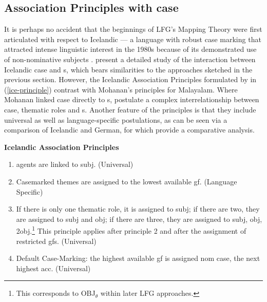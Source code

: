 \documentclass[output=paper,hidelinks]{langscibook}
\begin{document}
\subsection{Association Principles with case}

It is perhaps no accident that the beginnings of LFG's Mapping Theory were first
articulated with respect to Icelandic \citep{ZMT85:Case} --- a language with
robust case marking that attracted intense linguistic interest in the 1980s
because of its demonstrated use of non-nominative subjects \citep{Andrews76:VP}.
\citet{ZMT85:Case} present a detailed study of the interaction between Icelandic
case and {\GF}s, which bears similarities to the approaches sketched in the previous
section.  However, the Icelandic Association Principles formulated by
\citet{ZMT85:Case} in (\ref{ice-principle}) contrast with Mohanan's principles
for Malayalam. Where
Mohanan linked case directly to {\GF}s, \citet{ZMT85:Case} postulate a complex
interrelationship between case, thematic roles and {\GF}s. Another feature of
the principles is that they include  universal as well as language-specific
postulations, as can be seen via a comparison of Icelandic and German, for which
\citet{ZMT85:Case} provide a comparative analysis. 


\ea \label{ice-principle}
{\bf Icelandic Association Principles}

\begin{enumerate}

\item {\sc agents} are linked to {\sc subj}. (Universal)

\item Casemarked {\sc themes} are assigned to the lowest available
{\sc gf}.  (Language Specific)

\item If there is only one thematic role, it is assigned to {\sc subj}; if there are two, they are assigned to {\sc subj} and {\sc obj}; if there are three, they are assigned to {\sc subj}, {\sc obj}, {\sc 2obj}.\footnote{This corresponds to OBJ$_{\theta}$ within later LFG approaches.} This principle applies after principle 2 and after the assignment of restricted {\sc gf}s. (Universal)

\item Default Case-Marking:  the highest available {\sc gf} is
assigned {\sc nom} case, the next highest {\sc acc}. (Universal)

\end{enumerate}
\z
\end{document}
